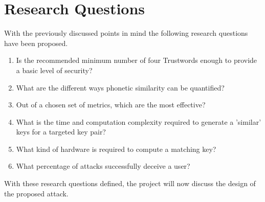 \section{Research Questions}

With the previously discussed points in mind the following research questions have been proposed.

\begin{enumerate}

    \item Is the recommended minimum number of four Trustwords enough to provide a basic level of security? \label{goal:numberOfTrustwords}
    
    \item What are the different ways phonetic similarity can be quantified?  \label{goal:phoneticSimilarity}

    \item Out of a chosen set of metrics, which are the most effective? \label{goal:bestMetrics}

    \item What is the time and computation complexity required to generate a 'similar' keys for a targeted key pair? \label{goal:complexity}
    
    \item What kind of hardware is required to compute a matching key? \label{goal:hardwareRequired}

    \item What percentage of attacks successfully deceive a user? \label{goal:attackPercentage}
\end{enumerate}

With these research questions defined, the project will now discuss the design of the proposed attack.